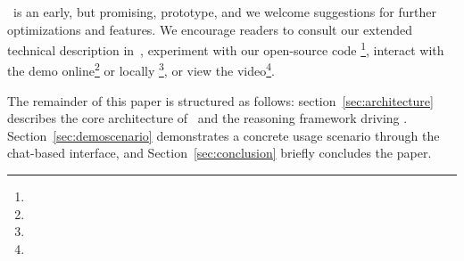 \chat\ is an early, but promising, prototype, and we welcome suggestions for further optimizations and features. 
We encourage readers to consult our extended technical description in~\cite{palimpzestCIDR}, experiment with our open-source \sys{} code \footnote{\systemurl}, interact with the \chat{} demo online\footnote{\demourl} or locally \footnote{\chatcode}, or view the video\footnote{\demovideo}.

The remainder of this paper is structured as follows:  
section~\ref{sec:architecture} describes the core architecture of \sys\ and the reasoning framework driving \chat.
Section~\ref{sec:demoscenario} demonstrates a concrete usage scenario through the chat-based interface, and Section~\ref{sec:conclusion} briefly concludes the paper.
